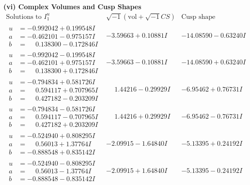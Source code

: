 \documentclass[1p]{elsarticle_modified}
\theoremstyle{definition}
\newcommand{\I}{\sqrt{-1}}
\begin{document}
\newpage\flushleft \textbf{(vi) Complex Volumes and Cusp Shapes}
$$\begin{array}{c|c|c}  
\text{Solutions to }I^u_{1}& \I (\text{vol} + \sqrt{-1}CS) & \text{Cusp shape}\\
 \hline 
\begin{aligned}
u &= -0.992042 + 0.199548 I \\
a &= -0.462101 - 0.975157 I \\
b &= \phantom{-}0.138300 - 0.172846 I\end{aligned}
 & -3.59663 + 0.10881 I & -14.08590 - 0.63240 I \\ \hline\begin{aligned}
u &= -0.992042 - 0.199548 I \\
a &= -0.462101 + 0.975157 I \\
b &= \phantom{-}0.138300 + 0.172846 I\end{aligned}
 & -3.59663 - 0.10881 I & -14.08590 + 0.63240 I \\ \hline\begin{aligned}
u &= -0.794834 + 0.581726 I \\
a &= \phantom{-}0.594117 + 0.707965 I \\
b &= \phantom{-}0.427182 - 0.203209 I\end{aligned}
 & \phantom{-}1.44216 - 0.29929 I & -6.95462 + 0.76731 I \\ \hline\begin{aligned}
u &= -0.794834 - 0.581726 I \\
a &= \phantom{-}0.594117 - 0.707965 I \\
b &= \phantom{-}0.427182 + 0.203209 I\end{aligned}
 & \phantom{-}1.44216 + 0.29929 I & -6.95462 - 0.76731 I \\ \hline\begin{aligned}
u &= -0.524940 + 0.808295 I \\
a &= \phantom{-}0.56013 + 1.37764 I \\
b &= -0.888548 + 0.835142 I\end{aligned}
 & -2.09915 - 1.64840 I & -5.13395 + 0.24192 I \\ \hline\begin{aligned}
u &= -0.524940 - 0.808295 I \\
a &= \phantom{-}0.56013 - 1.37764 I \\
b &= -0.888548 - 0.835142 I\end{aligned}
 & -2.09915 + 1.64840 I & -5.13395 - 0.24192 I \\ \hline\begin{aligned}

\end{aligned}
\end{array}$$
\end{document}
